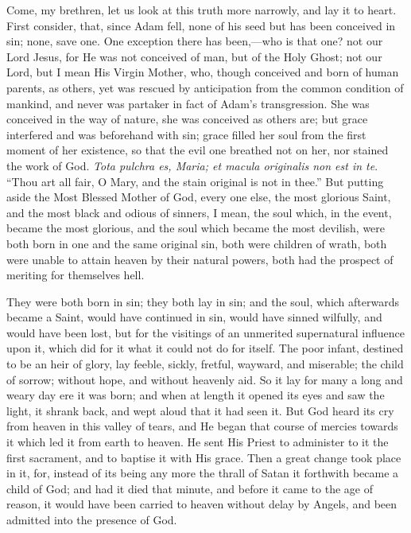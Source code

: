 Come, my brethren, let us look at this truth more narrowly, and lay
it to heart. First consider, that, since Adam fell, none of his seed
but has been conceived in sin; none, save one. One exception there has
been,—who is that one? not our Lord Jesus, for He was not conceived
of man, but of the Holy Ghost; not our Lord, but I mean His Virgin
Mother, who, though conceived and born of human parents, as others,
yet was rescued by anticipation from the common condition of mankind,
and never was partaker in fact of Adam's transgression. She was
conceived in the way of nature, she was conceived as others are; but
grace interfered and was beforehand with sin; grace filled her soul
from the first moment of her existence, so that the evil one breathed
not on her, nor stained the work of God. \emph{Tota pulchra es, Maria; et
macula originalis non est in te}. ``Thou art all fair, O Mary,
and the stain original is not in thee.'' But putting aside the
Most Blessed Mother of God, every one else, the most glorious Saint,
and the most black and odious of sinners, I mean, the soul which, in
the event, became the most glorious, and the soul which became the
most devilish, were both born in one and the same original sin, both
were children of wrath, both were unable to attain heaven by their
natural powers, both had the prospect of meriting for themselves hell.

They were both born in sin; they both lay in sin; and the soul,
which afterwards became a Saint, would have continued in sin, would
have sinned wilfully, and would have been lost, but for the visitings
of an unmerited supernatural influence upon it, which did for it what
it could not do for itself. The poor infant, destined to be an heir of
glory, lay feeble, sickly, fretful, wayward, and miserable; the child
of sorrow; without hope, and without heavenly aid. So it lay for many
a long and weary day ere it was born; and when at length it opened its
eyes and saw the light, it shrank back, and wept aloud that it had
seen it. But God heard its cry from heaven in this valley of tears,
and He began that course of mercies towards it which led it from earth
to heaven. He sent His Priest to administer to it the first sacrament,
and to baptise it with His grace. Then a great change took place in
it, for, instead of its being any more the thrall of Satan it
forthwith became a child of God; and had it died that minute, and
before it came to the age of reason, it would have been carried to
heaven without delay by Angels, and been admitted into the presence of
God.


